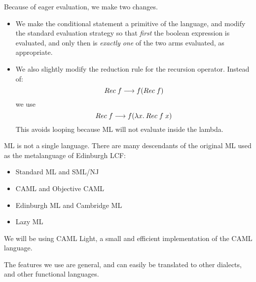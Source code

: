 \begin{slide*}


\vspace*{0.5cm}

Because of eager evaluation, we make two changes.

\begin{itemize}

\item We make the conditional statement a primitive of the language, and modify
the standard evaluation strategy so that {\em first} the boolean expression is
evaluated, and only then is {\em exactly one} of the two arms evaluated, as
appropriate.

\item We also slightly modify the reduction rule for the recursion operator.
Instead of:
{\red $$ Rec\; f \longrightarrow f(Rec\; f) $$}
we use
{\red $$ Rec\; f \longrightarrow f(\lambda x.\: Rec\; f\; x) $$}
This avoids looping because ML will not evaluate inside the lambda.

\end{itemize}

\end{slide*}



\begin{slide*}


\vspace*{0.5cm}

ML is not a single language. There are many descendants of the original ML used
as the metalanguage of Edinburgh LCF:

\begin{itemize}

\item Standard ML and SML/NJ

\item CAML and Objective CAML

\item Edinburgh ML and Cambridge ML

\item Lazy ML

\end{itemize}

We will be using CAML Light, a small and efficient implementation of the CAML
language.

The features we use are general, and can easily be translated to other
dialects, and other functional languages.

\end{slide*}



